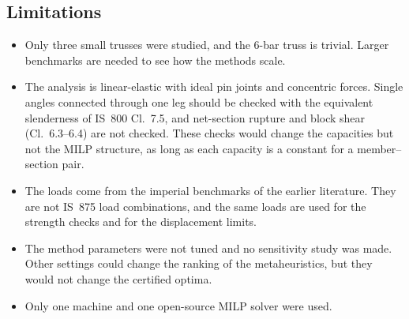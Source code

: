 \documentclass[lineno,pdflatex,sn-mathphys-num]{sn-jnl}
\begin{document}
\subsection{Limitations}
\begin{itemize}
\item Only three small trusses were studied, and the 6-bar truss is trivial.
      Larger benchmarks are needed to see how the methods scale.
\item The analysis is linear-elastic with ideal pin joints and concentric
      forces. Single angles connected through one leg should be checked with
      the equivalent slenderness of IS~800 Cl.~7.5, and net-section rupture and
      block shear (Cl.~6.3--6.4) are not checked. These checks would change the
      capacities but not the MILP structure, as long as each capacity is a
      constant for a member--section pair.
\item The loads come from the imperial benchmarks of the earlier literature.
      They are not IS~875 load combinations, and the same loads are used for the
      strength checks and for the displacement limits.
\item The method parameters were not tuned and no sensitivity study was made.
      Other settings could change the ranking of the metaheuristics, but they
      would not change the certified optima.
\item Only one machine and one open-source MILP solver were used.
\end{itemize}

\end{document}
